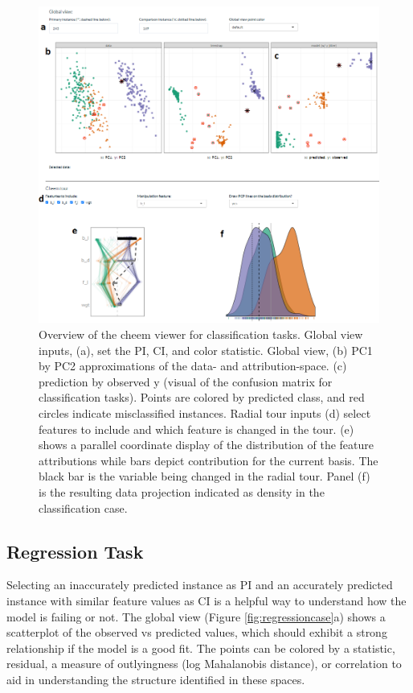 \documentclass[11pt,twoside]{article}
\begin{document}
\begin{figure}

{\centering \includegraphics[width=1\linewidth]{./figures/app_classification} 

}

\caption{Overview of the cheem viewer for classification tasks. Global view inputs, (a), set the PI, CI, and color statistic. Global view, (b) PC1 by PC2 approximations of the data- and attribution-space. (c) prediction by observed y (visual of the confusion matrix for classification tasks). Points are colored by predicted class, and red circles indicate misclassified instances. Radial tour inputs (d) select features to include and which feature is changed in the tour. (e) shows a parallel coordinate display of the distribution of the feature attributions while bars depict contribution for the current basis. The black bar is the variable being changed in the radial tour. Panel (f) is the resulting data projection indicated as density in the classification case.}\label{fig:classificationcase}
\end{figure}

\hypertarget{regression-task}{%
\subsection{Regression Task}\label{regression-task}}

Selecting an inaccurately predicted instance as PI and an accurately predicted instance with similar feature values as CI is a helpful way to understand how the model is failing or not. The global view (Figure \ref{fig:regressioncase}a) shows a scatterplot of the observed vs predicted values, which should exhibit a strong relationship if the model is a good fit. The points can be colored by a statistic, residual, a measure of outlyingness (log Mahalanobis distance), or correlation to aid in understanding the structure identified in these spaces.
\end{document}
